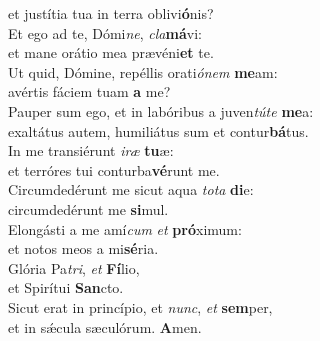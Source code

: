 \oddverse et justítia tua in terra oblivi\textbf{ó}nis?\\
\evenverse Et ego ad te, Dómi\textit{ne}, \textit{cla}\textbf{má}vi:~\*\\
\evenverse et mane orátio mea prævéni\textbf{et} te.\\
\oddverse Ut quid, Dómine, repéllis orati\textit{ó}\textit{nem} \textbf{me}am:~\*\\
\oddverse avértis fáciem tuam \textbf{a} me?\\
\evenverse Pauper sum ego, et in labóribus a juven\textit{tú}\textit{te} \textbf{me}a:~\*\\
\evenverse exaltátus autem, humiliátus sum et contur\textbf{bá}tus.\\
\oddverse In me transiérunt \textit{i}\textit{ræ} \textbf{tu}æ:~\*\\
\oddverse et terróres tui conturba\textbf{vé}runt me.\\
\evenverse Circumdedérunt me sicut aqua \textit{to}\textit{ta} \textbf{di}e:~\*\\
\evenverse circumdedérunt me \textbf{si}mul.\\
\oddverse Elongásti a me amí\textit{cum} \textit{et} \textbf{pró}ximum:~\*\\
\oddverse et notos meos a mi\textbf{sé}ria.\\
\evenverse Glória Pa\textit{tri}, \textit{et} \textbf{Fí}lio,~\*\\
\evenverse et Spirítui \textbf{San}cto.\\
\oddverse Sicut erat in princípio, et \textit{nunc}, \textit{et} \textbf{sem}per,~\*\\
\oddverse et in sǽcula sæculórum. \textbf{A}men.\\
